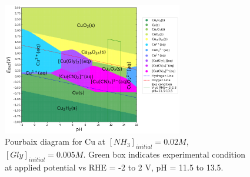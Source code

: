 \documentclass[journal=jacsat,manuscript=article,email=false]{achemso}
\begin{document}
\begin{figure}[htbp]
    \centering
    \includegraphics[width=0.7\textwidth]{Figures/pourbaix_diagrams/Cu-NH3-H2O_activity=1e-04_[NH3]=0.02M_[Gly]=0.005M_[CN]=0.0001.png}
    \caption{Pourbaix diagram for Cu at $[NH_3]_{initial}= 0.02M$, $[Gly]_{initial}=0.005M$. Green box indicates experimental condition at applied potential vs RHE = -2 to 2 V, pH = 11.5 to 13.5.}
    \label{fig:Cu_Pourbaix_NH3_Gly_SI}
\end{figure}
\end{document}
